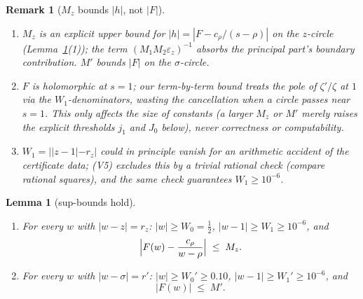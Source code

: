 \documentclass[11pt]{amsart}
\newtheorem{lemma}[theorem]{Lemma}
\newtheorem{remark}[theorem]{Remark}
\numberwithin{equation}{section}
\newcommand{\Sig}{\sigma}
\begin{document}
\begin{remark}[$M_z$ bounds $|h|$, not $|F|$]\label{rem:cancellation}\
\begin{enumerate}
\item $M_z$ is an explicit upper bound for
$|h| = |F - c_\rho/(s-\rho)|$ on the $z$-circle
(Lemma~\ref{lem:Mz-hold}(1)); the term
$(M_1M_2\varepsilon_z)^{-1}$ absorbs the principal part's boundary
contribution. $M'$ bounds $|F|$ on the $\Sig$-circle.
\item $F$ is holomorphic at $s=1$; our term-by-term bound treats the
pole of $\zeta'/\zeta$ at $1$ via the $W_1$-denominators, wasting the
cancellation when a circle passes near $s=1$. This only affects the
size of constants (a larger $M_z$ or $M'$ merely raises the explicit
thresholds $j_1$ and $J_0$ below), never correctness or computability.
\item $W_1 = ||z-1|-r_z|$ could in principle vanish for an arithmetic
accident of the certificate data; (V5) excludes this by a trivial
rational check (compare rational squares), and the same check
guarantees $W_1 \ge 10^{-6}$.
\end{enumerate}
\end{remark}

\begin{lemma}[sup-bounds hold]\label{lem:Mz-hold}\
\begin{enumerate}
\item For every $w$ with $|w - z| = r_z$:
$|w| \ge W_0 = \tfrac12$, $|w - 1| \ge W_1 \ge 10^{-6}$, and
\[
\Bigl|F(w) - \frac{c_\rho}{w-\rho}\Bigr| \;\le\; M_z.
\]
\item For every $w$ with $|w - \Sig| = r'$:
$|w| \ge W_0' \ge 0.10$, $|w-1| \ge W_1' \ge 10^{-6}$, and
\[
|F(w)| \;\le\; M'.
\]
\end{enumerate}
\end{lemma}
\end{document}

